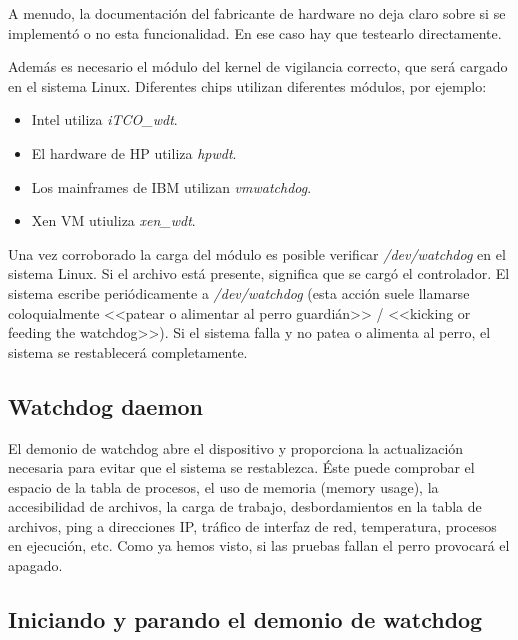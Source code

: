 \documentclass[a4paper, 11pt, titlepage]{book}
\begin{document}
        A menudo, la documentación del fabricante de hardware no deja claro 
        sobre si se implementó o no esta funcionalidad. En ese caso hay que 
        testearlo directamente.

        Además es necesario el módulo del kernel de vigilancia correcto, que será 
        cargado en el sistema Linux. Diferentes chips utilizan diferentes módulos,
        por ejemplo:

        \begin{itemize}
            \item Intel utiliza \textit{iTCO\_wdt}.
            \item El hardware de HP utiliza \textit{hpwdt}.
            \item Los mainframes de IBM utilizan \textit{vmwatchdog}.
            \item Xen VM utiuliza \textit{xen\_wdt}.
        \end{itemize}

        Una vez corroborado la carga del módulo es posible verificar \textit{/dev/watchdog}
        en el sistema Linux. Si el archivo está presente, significa que se cargó el controlador.
        El sistema escribe periódicamente a \textit{/dev/watchdog} (esta acción
        suele llamarse coloquialmente <<patear o alimentar al perro guardián>> / <<kicking
        or feeding the watchdog>>). Si el sistema falla y no patea o alimenta al 
        perro, el sistema se restablecerá completamente.

    \subsection{Watchdog daemon}

        El demonio de watchdog abre el dispositivo y proporciona la actualización 
        necesaria para evitar que el sistema se restablezca. Éste puede comprobar 
        el espacio de la tabla de procesos, el uso de memoria (memory usage), la 
        accesibilidad de archivos, la carga de trabajo, desbordamientos en la tabla de 
        archivos, ping a direcciones IP, tráfico de interfaz de red, temperatura, 
        procesos en ejecución, etc. Como ya hemos visto, si las pruebas fallan 
        el perro provocará el apagado.

    \subsection{Iniciando y parando el demonio de watchdog}
\end{document}
